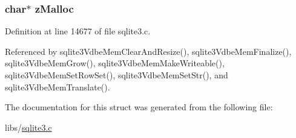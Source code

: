 \hypertarget{struct_mem_a61cff46330bc94e3750512be20335341}{}
\subsubsection[{z\+Malloc}]{\setlength{\rightskip}{0pt plus 5cm}char$\ast$ z\+Malloc}\label{struct_mem_a61cff46330bc94e3750512be20335341}


Definition at line 14677 of file sqlite3.\+c.



Referenced by sqlite3\+Vdbe\+Mem\+Clear\+And\+Resize(), sqlite3\+Vdbe\+Mem\+Finalize(), sqlite3\+Vdbe\+Mem\+Grow(), sqlite3\+Vdbe\+Mem\+Make\+Writeable(), sqlite3\+Vdbe\+Mem\+Set\+Row\+Set(), sqlite3\+Vdbe\+Mem\+Set\+Str(), and sqlite3\+Vdbe\+Mem\+Translate().



The documentation for this struct was generated from the following file\+:\begin{DoxyCompactItemize}
\item 
libs/\hyperlink{sqlite3_8c}{sqlite3.\+c}\end{DoxyCompactItemize}
